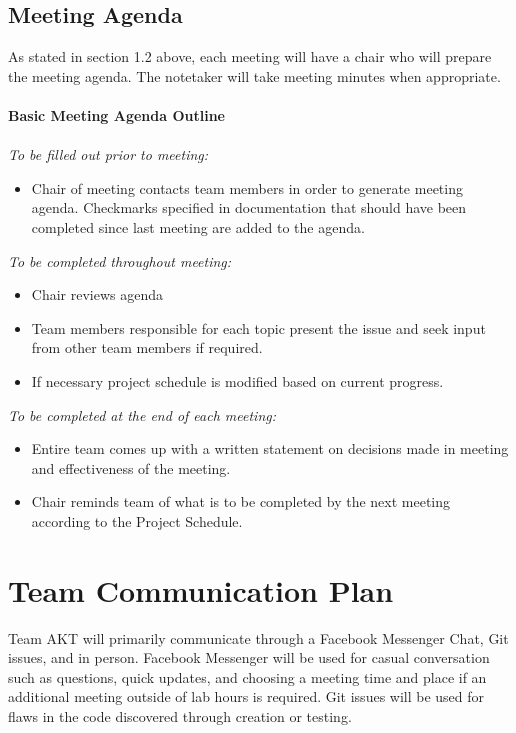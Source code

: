 \documentclass[12pt,fleqn]{article}
\begin{document}
\subsection{Meeting Agenda}
As stated in section 1.2 above, each meeting will have a chair who will prepare the meeting agenda.  The notetaker will take meeting minutes when appropriate.  \\ \\
\textbf{Basic Meeting Agenda Outline} \\ \\
\textit{To be filled out prior to meeting:}
\begin{itemize}
    \item Chair of meeting contacts team members in order to generate meeting agenda.  Checkmarks specified in documentation that should have been completed since last meeting are added to the agenda.
\end{itemize}

\textit{To be completed throughout meeting:}
\begin{itemize}
    \item Chair reviews agenda
    \item Team members responsible for each topic present the issue and seek input from other team members if required.
    \item If necessary project schedule is modified based on current progress.
\end{itemize}

\textit{To be completed at the end of each meeting:}
\begin{itemize}
    \item Entire team comes up with a written statement on decisions made in meeting and effectiveness of the meeting.
    \item Chair reminds team of what is to be completed by the next meeting according to the Project Schedule.
\end{itemize}


\section {Team Communication Plan}
Team AKT will primarily communicate through a Facebook Messenger Chat, Git issues, and in person.  Facebook Messenger will be used for casual conversation such as questions, quick updates, and choosing a meeting time and place if an additional meeting outside of lab hours is required. Git issues will be used for flaws in the code discovered through creation or testing.
\end{document}
